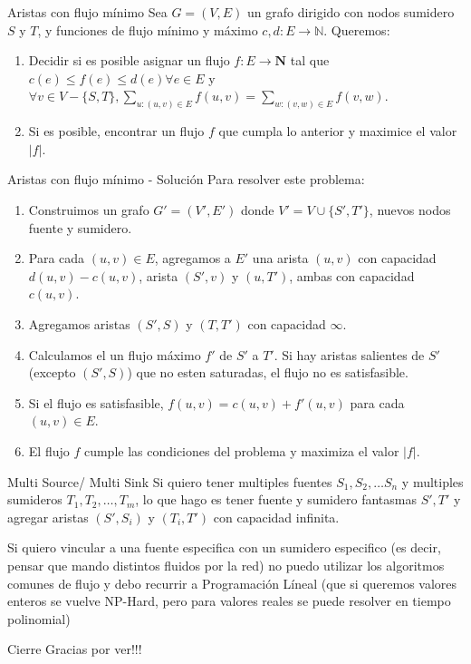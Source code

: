 \documentclass{beamer}
\begin{document}

\begin{frame}{Aristas con flujo mínimo}
    Sea $G = (V,E)$ un grafo dirigido con nodos sumidero $S$ y $T$, y funciones de flujo mínimo y máximo $c,d: E \to \mathbb{N}$.
    Queremos:
    \begin{enumerate}
        \item Decidir si es posible asignar un flujo $f: E \to \textbf{N}$ tal que $c(e) \leq f(e) \leq d(e) \forall e \in E$ y $\forall v \in V - \{S,T\}, \sum_{u: (u,v) \in E} f(u,v) = \sum_{w: (v,w) \in E} f(v,w)$.
        \item Si es posible, encontrar un flujo $f$ que cumpla lo anterior y maximice el valor $|f|$.
    \end{enumerate}
\end{frame}

\begin{frame}{Aristas con flujo mínimo - Solución}
    Para resolver este problema:
    \begin{enumerate}
        \item Construimos un grafo $G' = (V', E')$ donde $V' = V \cup \{S', T'\}$, nuevos nodos fuente y sumidero.
        \pause
        \item Para cada $(u,v) \in E$, agregamos a $E'$ una arista $(u,v)$ con capacidad $d(u,v) - c(u,v)$, arista $(S',v)$ y $(u,T')$, ambas con capacidad $c(u,v)$.
        \pause
        \item Agregamos aristas $(S',S)$ y $(T,T')$ con capacidad $\infty$.
        \item Calculamos el un flujo máximo $f'$ de $S'$ a $T'$. Si hay aristas salientes de $S'$ (excepto $(S',S)$) que no esten saturadas, el flujo no es satisfasible.
        \pause 
        \item Si el flujo es satisfasible, $f(u,v) = c(u,v) + f'(u,v)$ para cada $(u,v) \in E$.
        \item El flujo $f$ cumple las condiciones del problema y maximiza el valor $|f|$.
    \end{enumerate}
\end{frame}

\begin{frame}{Multi Source/ Multi Sink}
    Si quiero tener multiples fuentes $S_1, S_2, \dots S_n$ y multiples sumideros $T_1, T_2, \dots, T_m$, lo que hago es tener fuente y sumidero fantasmas $S', T'$ y agregar aristas $(S',S_i)$ y $(T_i,T')$ con capacidad infinita.

    \pause
    \vspace{2em}

    Si quiero vincular a una fuente especifica con un sumidero especifico (es decir, pensar que mando distintos fluidos por la red) no puedo utilizar los algoritmos comunes de flujo y debo recurrir a Programación Líneal (que si queremos valores enteros se vuelve NP-Hard, pero para valores reales se puede resolver en tiempo polinomial)
\end{frame}

\begin{frame}{Cierre}
    Gracias por ver!!!
\end{frame}
\end{document}
